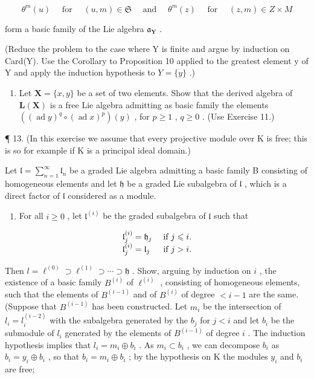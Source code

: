\[
\theta^ {m} (u) \quad \text { for } \quad (u, m) \in \mathfrak {S} \quad \text { and } \quad \theta^ {m} (z) \quad \text { for } \quad (z, m) \in Z \times M
\]

form a basic family of the Lie algebra \(\mathfrak{a}_{\mathbf{Y}}\) .

(Reduce the problem to the case where Y is finite and argue by induction on Card(Y). Use the Corollary to Proposition 10 applied to the greatest element y of Y and apply the induction hypothesis to \(Y = \{y\}\) .)

\begin{enumerate}
\def\labelenumi{\arabic{enumi}.}
\setcounter{enumi}{11}
\tightlist
\item
  Let \(\mathbf{X} = \{x, y\}\) be a set of two elements. Show that the derived algebra of \(\mathbf{L}(\mathbf{X})\) is a free Lie algebra admitting as basic family the elements \(((\operatorname{ad}y)^q \circ (\operatorname{ad}x)^p)(y)\) , for \(p \geqslant 1\) , \(q \geqslant 0\) . (Use Exercise 11.)
\end{enumerate}

¶ 13. (In this exercise we assume that every projective module over K is free; this is so for example if K is a principal ideal domain.)

Let \(\mathfrak{l} = \sum_{n=1}^{\infty} \mathfrak{l}_n\) be a graded Lie algebra admitting a basic family B consisting of homogeneous elements and let \(\mathfrak{h}\) be a graded Lie subalgebra of \(\mathfrak{l}\) , which is a direct factor of \(\mathfrak{l}\) considered as a module.

\begin{enumerate}
\def\labelenumi{(\alph{enumi})}
\tightlist
\item
  For all \(i \geqslant 0\) , let \(\mathfrak{l}^{(i)}\) be the graded subalgebra of \(\mathfrak{l}\) such that
\end{enumerate}

\[
\begin{array}{l l} \mathfrak {l} _ {j} ^ {(i)} = \mathfrak {h} _ {j} & \text { if } j \leqslant i. \\ \mathfrak {l} _ {j} ^ {(i)} = \mathfrak {l} _ {j} & \text { if } j > i. \end{array}
\]

Then \(l = \ell^{(0)} \supset \ell^{(1)} \supset \cdots \supset \mathfrak{h}\) . Show, arguing by induction on \(i\) , the existence of a basic family \(B^{(i)}\) of \(\ell^{(i)}\) , consisting of homogeneous elements, such that the elements of \(B^{(i-1)}\) and of \(B^{(i)}\) of degree \(< i - 1\) are the same. (Suppose that \(B^{(i-1)}\) has been constructed. Let \(m_i\) be the intersection of \(l_i = l_i^{(i-2)}\) with the subalgebra generated by the \(b_j\) for \(j < i\) and let \(b_i\) be the submodule of \(l_i\) generated by the elements of \(B^{(i-1)}\) of degree \(i\) . The induction hypothesis implies that \(l_i = m_i \oplus b_i\) . As \(m_i \subset b_i\) , we can decompose \(b_i\) as \(b_i = y_i \oplus b_i\) , so that \(b_i = m_i \oplus b_i\) ; by the hypothesis on K the modules \(y_i\) and \(b_i\) are free;


